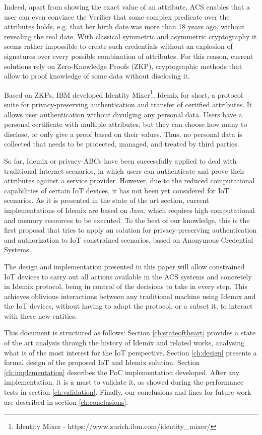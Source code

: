 Indeed, apart from showing the exact value of an attribute, ACS enables that a user can even convince the Verifier that some complex predicate over the attributes holds, e.g. that her birth date was more than 18 years ago, without revealing the real date. With classical symmetric and asymmetric cryptography it seems rather impossible to create such credentials without an explosion of signatures over every possible combination of attributes. For this reason, current solutions rely on  Zero-Knowledge Proofs (ZKP), cryptographic methods that allow to proof knowledge of some data without disclosing it.

Based on ZKPs, IBM developed Identity Mixer\footnote{Identity Mixer - {https://www.zurich.ibm.com/identity\_mixer/}}, %
Idemix for short, a protocol suite for privacy-preserving authentication and transfer of certified attributes. It allows user authentication without divulging any personal data. Users have a personal certificate with multiple attributes, but they can choose how many to disclose, or only give a proof based on their values. Thus, no personal data is collected that needs to be protected, managed, and treated by third parties.

So far, Idemix or privacy-ABCs have been successfully applied to deal with traditional Internet scenarios, in which users can authenticate and prove their attributes against a service provider. However, due to the reduced computational capabilities of certain IoT devices, it has not been yet considered for IoT scenarios. As it is presented in the state of the art section, current implementations of Idemix are based on Java, which requires high computational and memory resources to be executed. To the best of our knowledge, this is the first proposal that tries to apply an solution for privacy-preserving authentication and authorization to IoT constrained scenarios, based on Anonymous Credential Systems.

The design and implementation presented in this paper will allow constrained IoT devices to carry out all actions available in the ACS systems and concretely in Idemix protocol, being in control of the decisions to take in every step. This achieves oblivious interactions between any traditional machine using Idemix and the IoT devices, without having to adapt the protocol, or a subset it, to interact with these new entities.

\hfil

This document is structured as follows: Section \ref{ch:stateoftheart} provides a state of the art analysis through the history of Idemix and related works, analysing what is of the most interest for the IoT perspective. Section \ref{ch:design} presents a formal design of the proposed IoT and Idemix solution. Section \ref{ch:implementation} describes the PoC implementation developed. After any implementation, it is a must to validate it, as showed during the performance tests in section \ref{ch:validation}. Finally, our conclusions and lines for future work are described in section \ref{ch:conclusions}.
